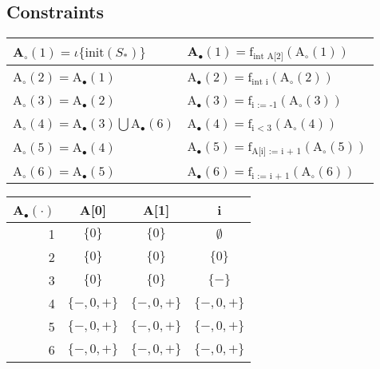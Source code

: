 \subsection{Constraints}
\begin{table}[H]
\begin{tabular}{| l | l |}
\hline
A$_\circ (1) = \iota \{\text{init}(S_*) \} $ & A$_\bullet(1) = \text{f}_{\text{int A[2]}} (\text{A}_\circ (1))$ \\
\hline
A$_\circ (2) =$A$_\bullet(1) $ & A$_\bullet(2) = \text{f}_{\text{int i}} (\text{A}_\circ (2))$ \\
\hline
A$_\circ (3) = $A$_\bullet(2)$ & A$_\bullet(3) = \text{f}_{\text{i := -1}} (\text{A}_\circ (3))$  \\
\hline
A$_\circ (4) = $A$_\bullet(3) \bigcup $A$_\bullet(6) $ & A$_\bullet(4) = \text{f}_{\text{i < 3}} (\text{A}_\circ (4))$ \\
\hline
A$_\circ (5) = $A$_\bullet(4)$ & A$_\bullet(5) = \text{f}_{\text{A[i] := i + 1}} (\text{A}_\circ (5))$ \\
\hline
A$_\circ (6) = $A$_\bullet(5)$ & A$_\bullet(6) = \text{f}_{\text{i := i + 1}} (\text{A}_\circ (6))$ \\

\hline
\end{tabular}
\centering
\end{table}

\begin{table}[H]
\begin{tabular}{| r | c | c | c |}
\hline
A$_\bullet (\cdot) $ & A[0]        & A[1]        & i \\
\hline
1                    & $\{0\}$     & $\{0\} $    & $\emptyset$ \\
2                    & $\{0\}$     & $\{0\} $    & $\{0\}$ \\
3                    & $\{0\}$     & $\{0\} $    & $\{-\}$ \\
4                    & $\{-,0,+\}$ & $\{-,0,+\}$ & $\{-,0,+\}$ \\
5                    & $\{-,0,+\}$ & $\{-,0,+\}$ & $\{-,0,+\}$ \\
6                    & $\{-,0,+\}$ & $\{-,0,+\}$ & $\{-,0,+\}$ \\
\hline
\end{tabular}
\centering
\end{table}
